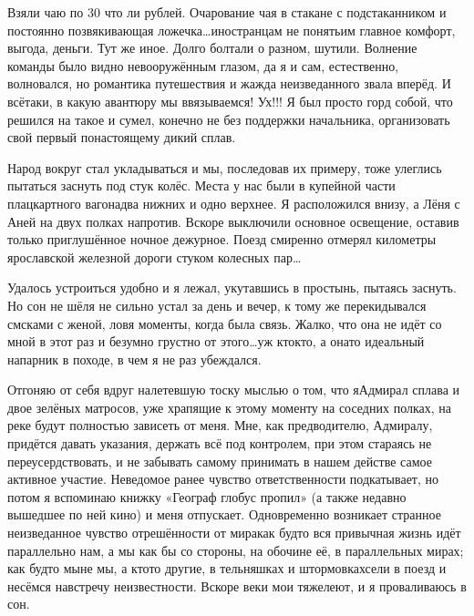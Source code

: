 Взяли чаю по 30 что ли рублей. Очарование чая в стакане с подстаканником и постоянно позвякивающая ложечка\ldots иностранцам не понять\mdash им главное комфорт, выгода, деньги. Тут же иное. Долго болтали о разном, шутили. Волнение команды было видно невооружённым глазом, да я и сам, естественно, волновался, но романтика путешествия и жажда неизведанного звала вперёд. И всё\sdash таки, в какую авантюру мы ввязываемся! Ух!!! Я был просто горд собой, что решился на такое и сумел, конечно не без поддержки начальника, организовать свой первый по\sdash настоящему дикий сплав. 

Народ вокруг стал укладываться и мы, последовав их примеру, тоже улеглись пытаться заснуть под стук колёс. Места у нас были в купейной части плацкартного вагона\mdash два нижних и одно верхнее. Я расположился внизу, а Лёня с Аней на двух полках напротив. Вскоре выключили основное освещение, оставив только приглушённое ночное дежурное. Поезд смиренно отмерял километры ярославской железной дороги стуком колесных пар\ldots

Удалось устроиться удобно и я лежал, укутавшись в простынь, пытаясь заснуть. Но сон не шёл\mdash я не сильно устал за день и вечер, к тому же перекидывался смс\sdash ками с женой, ловя моменты, когда была связь. Жалко, что она не идёт со мной в этот раз и безумно грустно от этого\ldots уж кто\sdash кто, а она\sdash то идеальный напарник в походе, в чем я не раз убеждался.
 
Отгоняю от себя вдруг налетевшую тоску мыслью о том, что я\mdash Адмирал сплава и двое зелёных матросов, уже храпящие к этому моменту на соседних полках, на реке будут полностью зависеть от меня. Мне, как предводителю, Адмиралу, придётся давать указания, держать всё под контролем, при этом стараясь не переусердствовать, и не забывать самому принимать в нашем действе самое активное участие. Неведомое ранее чувство ответственности подкатывает, но потом я вспоминаю книжку «Географ глобус пропил» (а также недавно вышедшее по ней кино) и меня отпускает. Одновременно возникает странное неизведанное чувство отрешённости от мира\mdash как будто вся привычная жизнь идёт параллельно нам, а мы как бы со стороны, на обочине её, в параллельных мирах; как будто мы\mdash не мы, а кто\sdash то другие, в тельняшках и штормовках\mdash сели в поезд и несёмся навстречу неизвестности. Вскоре веки мои тяжелеют, и я проваливаюсь в сон.

\begin{center}
\end{center}